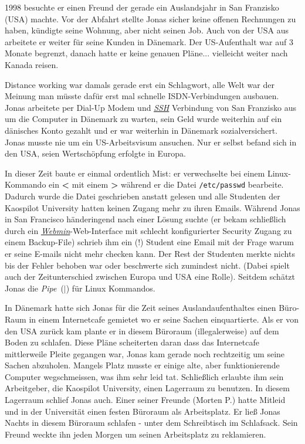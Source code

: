 1998 besuchte er einen Freund der gerade ein Auslandsjahr in San Franzisko (USA) machte. Vor der Abfahrt stellte Jonas sicher keine offenen Rechnungen zu haben, kündigte seine Wohnung, aber nicht seinen Job. Auch von der USA aus arbeitete er weiter für seine Kunden in Dänemark. Der US-Aufenthalt war auf 3 Monate begrenzt, danach hatte er keine genauen Pläne... vielleicht weiter nach Kanada reisen. 

Distance working war damals gerade erst ein Schlagwort, alle Welt war der Meinung man müsste dafür erst mal schnelle ISDN-Verbindungen ausbauen. Jonas arbeitete per Dial-Up Modem und \href{http://de.wikipedia.org/wiki/Secure_Shell}{\textit{SSH}} Verbindung von San Franzisko aus um die Computer in Dänemark zu warten, sein Geld wurde weiterhin auf ein dänisches Konto gezahlt und er war weiterhin in Dänemark sozialversichert. Jonas musste nie um ein US-Arbeitsvisum ansuchen. Nur er selbst befand sich in den USA, seien Wertschöpfung erfolgte in Europa.

In dieser Zeit baute er einmal ordentlich Mist: er verwechselte bei einem Linux-Kommando ein \textbf{\textless} mit einem \textbf{\textgreater} während er die Datei \texttt{/etc/passwd} bearbeite. Dadurch wurde die Datei geschrieben anstatt gelesen und alle Studenten der Kaospilot University hatten keinen Zugang mehr zu ihren Emails. Während Jonas in San Francisco händeringend nach einer Lösung suchte (er bekam schließlich durch ein \href{https://en.wikipedia.org/wiki/Webmin}{\textit{Webmin}}-Web-Interface mit schlecht konfigurierter Security Zugang zu einem Backup-File) schrieb ihm ein (!) Student eine Email mit der Frage warum er seine E-mails nicht mehr checken kann. Der Rest der Studenten merkte nichts bis der Fehler behoben war oder beschwerte sich zumindest nicht. (Dabei spielt auch der Zeitunterschied zwischen Europa und USA eine Rolle). Seitdem schätzt Jonas die \textit{Pipe}\ (\textbf{$|$}) für Linux Kommandos.

In Dänemark hatte sich Jonas für die Zeit seines Auslandaufenthaltes einen Büro-Raum in einem Internetcafe gemietet wo er seine Sachen einquartierte. Als er von den USA zurück kam plante er in diesem Büroraum (illegalerweise) auf dem Boden zu schlafen. Diese Pläne scheiterten daran dass das Internetcafe mittlerweile Pleite gegangen war, Jonas kam gerade noch rechtzeitig um seine Sachen abzuholen. Mangels Platz musste er einige alte, aber funktionierende Computer wegschmeissen, was ihm sehr leid tat. Schließlich erlaubte ihm sein Arbeitgeber, die Kaospilot University, einen Lagerraum zu benutzen. In diesem Lagerraum schlief Jonas auch. Einer seiner Freunde (Morten P.) hatte Mitleid und in der Universität einen festen Büroraum als Arbeitsplatz. Er ließ Jonas Nachts in diesem Büroraum schlafen -  unter dem Schreibtisch im Schlafsack. Sein Freund weckte ihn jeden Morgen um seinen Arbeitsplatz zu reklamieren.

